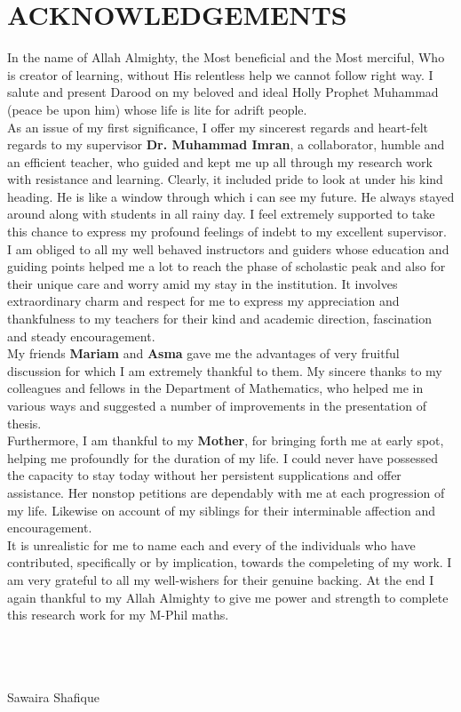 \chapter*{ACKNOWLEDGEMENTS}
\def\ds{\displaystyle\mathstrut}
\def\baselinestretch{1.0}


\indent\indent In the name of Allah Almighty, the Most beneficial and the Most merciful, Who is creator of learning, without His relentless help we cannot follow right way. I salute and present Darood on my beloved and ideal Holly Prophet Muhammad (peace be upon him) whose life is lite for adrift people.\\
As an issue of my first significance, I offer my sincerest regards and heart-felt regards to my supervisor {\bf {Dr. Muhammad Imran}}, a collaborator, humble and  an efficient teacher, who  guided and kept  me up all through my research work with resistance and learning. Clearly, it included  pride to look at under his kind heading. He is like a window through which i can see my future. He always stayed around along with students in all rainy day. I feel extremely supported to take this chance to express my profound feelings  of indebt to my excellent supervisor.\\  I am obliged to all my well behaved instructors and guiders whose education and guiding points helped me a lot to reach the phase of scholastic peak and also for their unique care and worry amid my stay in the institution. It involves extraordinary charm and respect for me to express my appreciation and thankfulness to my teachers for their kind and academic direction, fascination and steady encouragement.\\
 My friends\textbf{ Mariam} and \textbf{Asma }gave me the advantages of very fruitful discussion for which I am extremely thankful to them. My sincere thanks to my colleagues and fellows in the Department of Mathematics, who helped me in various ways and suggested a number of improvements in the presentation of thesis. \\Furthermore, I am thankful to my \textbf{Mother}, for bringing forth me at early spot, helping me profoundly for the duration of my life. I could never have possessed the capacity to stay today without her persistent supplications and offer assistance. Her nonstop petitions are dependably with me at each progression of my life. Likewise on account of my  siblings for their interminable affection and encouragement.\\
It is unrealistic for me to name each and every of the individuals who have contributed, specifically or by implication, towards the compeleting of my work. I am very grateful to all my well-wishers for their genuine backing. At the end I again thankful to my Allah Almighty to give me  power and strength to complete this research work for my M-Phil maths. \\
\\
\\
\\
\medskip


\bigskip\medskip

\noindent
\hfill Sawaira Shafique 


